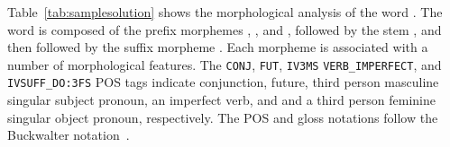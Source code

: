 Table~\ref{tab:samplesolution} shows the morphological analysis
of the word . 
The word is composed of the prefix morphemes 
, , and , followed by the 
stem , and then followed by the suffix morpheme
. 
Each morpheme is associated with a number of morphological features.
The {\tt CONJ},
{\tt FUT}, 
{\tt IV3MS} 
{\tt VERB\_IMPERFECT}, and 
{\tt IVSUFF\_DO:3FS} POS tags indicate
conjunction, 
future, 
third person masculine singular subject pronoun,
an imperfect verb, and 
and a third person feminine singular object pronoun, respectively.
The POS and gloss notations follow the Buckwalter notation~\cite{Buckwalter:02}.
